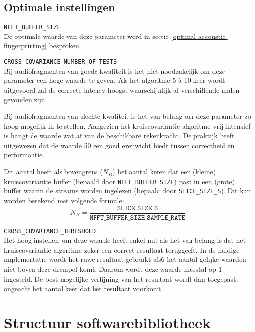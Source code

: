 \subsection{Optimale instellingen}
\begin{description}	
	\item\texttt{NFFT\_BUFFER\_SIZE} \hfill \\
	De optimale waarde van deze parameter werd in sectie \ref{optimal-accoustic-fingerprinting} besproken.
	
	\item\texttt{CROSS\_COVARIANCE\_NUMBER\_OF\_TESTS} \hfill \\
	Bij audiofragmenten van goede kwaliteit is het niet noodzakelijk om deze parameter een hoge waarde te geven. Als het algoritme 5 à 10 keer wordt uitgevoerd zal de correcte latency hoogst waarschijnlijk al verschillende malen gevonden zijn. 
	
	Bij audiofragmenten van slechte kwaliteit is het van belang om deze parameter zo hoog mogelijk in te stellen. Aangezien het kruiscovariantie algoritme vrij intensief is hangt de waarde wat af van de beschikbare rekenkracht. De praktijk heeft uitgewezen dat de waarde 50 een goed evenwicht biedt tussen correctheid en performantie.
	
	Dit aantal heeft als bovengrens ($ N_B $) het aantal keren dat een (kleine) kruiscovariantie buffer (bepaald door \texttt{NFFT\_BUFFER\_SIZE}) past in een (grote) buffer waarin de streams worden ingelezen (bepaald door \texttt{SLICE\_SIZE\_S}). Dit kan worden berekend met volgende formule:
	\begin{equation}
		N_B = \frac{\texttt{SLICE\_SIZE\_S}}{\texttt{NFFT\_BUFFER\_SIZE} \cdot \texttt{SAMPLE\_RATE}}
	\end{equation}
	
	\item\texttt{CROSS\_COVARIANCE\_THRESHOLD} \hfill \\
	Het hoog instellen van deze waarde heeft enkel nut als het van belang is dat het kruiscovariantie algoritme zeker een correct resultaat teruggeeft. In de huidige implementatie wordt het ruwe resultaat gebruikt als6 het aantal gelijke waarden niet boven deze drempel komt. Daarom wordt deze waarde meestal op 1 ingesteld. De best mogelijke verfijning van het resultaat wordt dan toegepast, ongeacht het aantal keer dat het resultaat voorkomt. 
\end{description}

\section{Structuur softwarebibliotheek}

